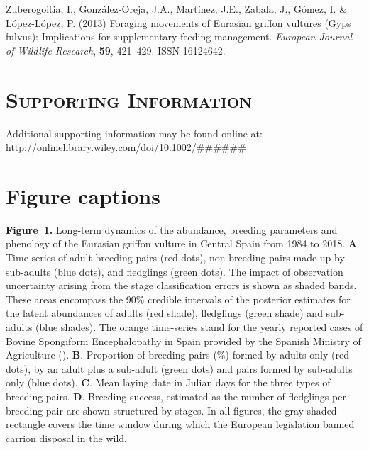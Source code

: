 \documentclass[12pt]{article}
\begin{document}
\begin{thebibliography}{87}
	Zuberogoitia, I., Gonz{\'{a}}lez-Oreja, J.A., Mart{\'{i}}nez, J.E., Zabala, J.,
	G{\'{o}}mez, I. \& L{\'{o}}pez-L{\'{o}}pez, P. (2013) {Foraging movements of
		Eurasian griffon vultures (Gyps fulvus): Implications for supplementary
		feeding management}.
	\newblock \emph{European Journal of Wildlife Research}, \textbf{59}, 421--429.
	\newblock ISSN 16124642.
	
\end{thebibliography}

\section*{\textsc{Supporting Information}}
Additional supporting information may be found online at:  \url{http://onlinelibrary.wiley.com/doi/10.1002/######}

\newpage

\section*{Figure captions}
\noindent \textbf{Figure~1.} Long-term dynamics of the abundance, breeding parameters and phenology of the Eurasian griffon vulture in Central Spain from 1984 to 2018. \textbf{A}. Time series of adult breeding pairs (red dots), non-breeding pairs made up by sub-adults (blue dots), and fledglings (green dots). The impact of observation uncertainty arising from the stage classification errors is shown as shaded bands. These areas encompass the 90\% credible intervals of the posterior estimates for the latent abundances of adults (red shade), fledglings (green shade) and sub-adults (blue shades). The orange time-series stand for the yearly reported cases of Bovine Spongiform Encephalopathy in Spain provided by the Spanish Ministry of Agriculture (\cite{MAPAMA2018}). \textbf{B}. Proportion of breeding pairs (\%) formed by adults only (red dots), by an adult plus a sub-adult (green dots) and pairs formed by sub-adults only (blue dots). \textbf{C}. Mean laying date in Julian days for the three types of breeding pairs. \textbf{D}. Breeding success, estimated as the number of fledglings per breeding pair are shown structured by stages. In all figures, the gray shaded rectangle covers the time window during which the European legislation banned carrion disposal in the wild.  \\
\end{document}
